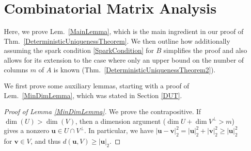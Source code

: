 \documentclass[journal, twocolumn]{IEEEtran}
\begin{document}


 \clearpage

\appendices
\section{Combinatorial Matrix Analysis}\label{appendixA}

Here, we prove Lem.~\ref{MainLemma}, which is the main ingredient in our proof of Thm.~\ref{DeterministicUniquenessTheorem}. We then outline how additionally assuming the spark condition \eqref{SparkCondition} for $B$ simplifies the proof and also allows for its extension to the case where only an upper bound on the number of columns $m$ of $A$ is known (Thm.~\ref{DeterministicUniquenessTheorem2}). 

We first prove some auxiliary lemmas, starting with a proof of Lem.~\ref{MinDimLemma}, which was stated in Section \ref{DUT}. 
\begin{proof}[Proof of Lemma \ref{MinDimLemma}]
We prove the contrapositive.  If $\dim(U) > \dim(V)$, then a dimension argument ($\dim U + \dim V^\perp > m$) gives a nonzero $\mathbf{u} \in U \cap V^\perp$.  In particular, we have $|\mathbf{u} - \mathbf{v}|_2^2 = |\mathbf{u}|_2^2 + |\mathbf{v}|_2^2 \geq |\mathbf{u}|_2^2$ for $\mathbf{v} \in V$, and thus $d(\mathbf{u},V) \geq |\mathbf{u}|_2$.
\end{proof}
\end{document}
